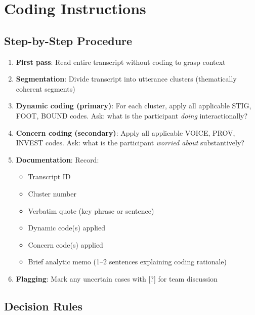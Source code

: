\documentclass[11pt]{article}
\begin{document}
\newpage
\section{Coding Instructions}

\subsection{Step-by-Step Procedure}

\begin{enumerate}[leftmargin=*]
\item \textbf{First pass}: Read entire transcript without coding to grasp context
\item \textbf{Segmentation}: Divide transcript into utterance clusters (thematically coherent segments)
\item \textbf{Dynamic coding (primary)}: For each cluster, apply all applicable STIG, FOOT, BOUND codes. Ask: what is the participant \textit{doing} interactionally?
\item \textbf{Concern coding (secondary)}: Apply all applicable VOICE, PROV, INVEST codes. Ask: what is the participant \textit{worried about} substantively?
\item \textbf{Documentation}: Record:
\begin{itemize}
\item Transcript ID
\item Cluster number
\item Verbatim quote (key phrase or sentence)
\item Dynamic code(s) applied
\item Concern code(s) applied
\item Brief analytic memo (1--2 sentences explaining coding rationale)
\end{itemize}
\item \textbf{Flagging}: Mark any uncertain cases with [?] for team discussion
\end{enumerate}

\subsection{Decision Rules}
\end{document}
